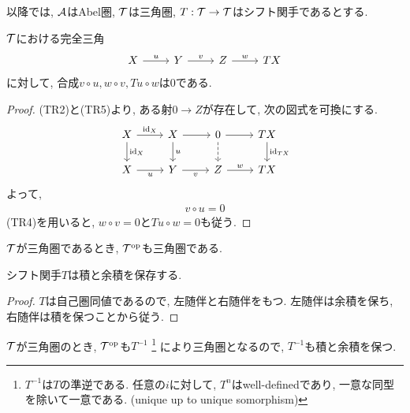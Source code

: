 \documentclass[uplatex, a4paper, 14Q, dvipdfmx]{jsarticle}
\begin{document}
以降では, $\mathcal{A}$はAbel圏, $\mathcal{T}$は三角圏, $T: \mathcal{T} \to \mathcal{T}$はシフト関手であるとする. 

\begin{lemma} \label{comp_zero}
  $\mathcal{T}$における完全三角
  \[\begin{tikzcd}
    X & Y & Z & TX
    \arrow["u", from=1-1, to=1-2]
    \arrow["v", from=1-2, to=1-3]
    \arrow["w", from=1-3, to=1-4]
  \end{tikzcd}\]
  に対して, 合成$v \circ u, w \circ v, Tu \circ w$は$0$である. 
\end{lemma}

\begin{proof}
  (TR2)と(TR5)より, ある射$0 \to Z$が存在して, 次の図式を可換にする. 
  \[\begin{tikzcd}
    X & X & 0 & TX \\
    X & Y & Z & TX
    \arrow["{\id_X}", from=1-1, to=1-2]
    \arrow[from=1-2, to=1-3]
    \arrow[from=1-3, to=1-4]
    \arrow["u"', from=2-1, to=2-2]
    \arrow["v"', from=2-2, to=2-3]
    \arrow["w", from=2-3, to=2-4]
    \arrow["{\id_X}", from=1-1, to=2-1]
    \arrow["u", from=1-2, to=2-2]
    \arrow[dashed, from=1-3, to=2-3]
    \arrow["{\id_{TX}}", from=1-4, to=2-4]
  \end{tikzcd}\]
  よって, 
  \begin{align*}
    v \circ u 
    = 0
  \end{align*}
  (TR4)を用いると, $w \circ v = 0$と$Tu \circ w = 0$も従う. 
\end{proof}

\begin{lemma}
  $\mathcal{T}$が三角圏であるとき, $\mathcal{T}^{\mathrm{op}}$も三角圏である. 
\end{lemma}

\begin{theorem} \label{preserve_limit}
  シフト関手$T$は積と余積を保存する. 
\end{theorem}

\begin{proof}
  $T$は自己圏同値であるので, 左随伴と右随伴をもつ. 
  左随伴は余積を保ち, 右随伴は積を保つことから従う. 
\end{proof}

\begin{remark}
  $\mathcal{T}$が三角圏のとき, $\mathcal{T}^{\mathrm{op}}$も$T^{-1}$
  \footnote{
    $T^{-1}$は$T$の準逆である. 
    任意の$i$に対して, $T^n$はwell-definedであり, 一意な同型を除いて一意である. (unique up to unique somorphism)
  }
  により三角圏となるので, $T^{-1}$も積と余積を保つ. 
\end{remark}
\end{document}
